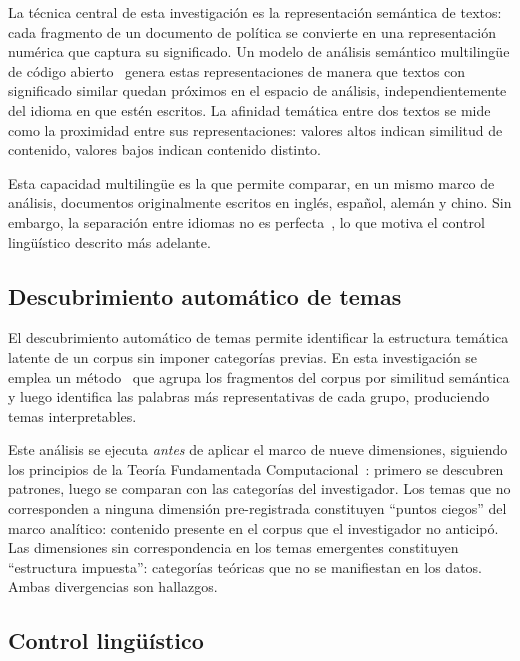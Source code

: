 La técnica central de esta investigación es la representación semántica de textos: cada fragmento de un documento de política se convierte en una representación numérica que captura su significado. Un modelo de análisis semántico multilingüe de código abierto~\citep{reimers2019sentencebert} genera estas representaciones de manera que textos con significado similar quedan próximos en el espacio de análisis, independientemente del idioma en que estén escritos. La afinidad temática entre dos textos se mide como la proximidad entre sus representaciones: valores altos indican similitud de contenido, valores bajos indican contenido distinto.

Esta capacidad multilingüe es la que permite comparar, en un mismo marco de análisis, documentos originalmente escritos en inglés, español, alemán y chino. Sin embargo, la separación entre idiomas no es perfecta~\citep{conneau2020unsupervised}, lo que motiva el control lingüístico descrito más adelante.


\subsection{Descubrimiento automático de temas}

El descubrimiento automático de temas permite identificar la estructura temática latente de un corpus sin imponer categorías previas. En esta investigación se emplea un método~\citep{grootendorst2022bertopic} que agrupa los fragmentos del corpus por similitud semántica y luego identifica las palabras más representativas de cada grupo, produciendo temas interpretables.

Este análisis se ejecuta \emph{antes} de aplicar el marco de nueve dimensiones, siguiendo los principios de la Teoría Fundamentada Computacional~\citep{nelson2020computational}: primero se descubren patrones, luego se comparan con las categorías del investigador. Los temas que no corresponden a ninguna dimensión pre-registrada constituyen ``puntos ciegos'' del marco analítico: contenido presente en el corpus que el investigador no anticipó. Las dimensiones sin correspondencia en los temas emergentes constituyen ``estructura impuesta'': categorías teóricas que no se manifiestan en los datos. Ambas divergencias son hallazgos.


\subsection{Control lingüístico}

